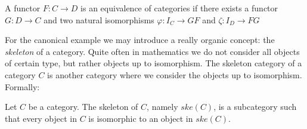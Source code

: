\begin{definition}
A functor $F:C\to D$ is an equivalence of categories if there exists a functor $G:D\to C$  and two natural isomorphisms $\varphi: I_C \to GF$ and $\zeta: I_D\to FG$
\end{definition}


For the canonical example we may introduce a really organic concept: the \emph{skeleton} of a category. Quite often in mathematics we do not consider all objects of certain type, but rather objects up to isomorphism. The skeleton category of a category $C$ is another category where we consider the objects up to isomorphism. Formally:
  \begin{definition}
    Let $C$ be a category. The skeleton of $C$, namely $ske(C)$, is a subcategory  such that every object in $C$ is isomorphic to an object in $ske(C)$.
  \end{definition}

